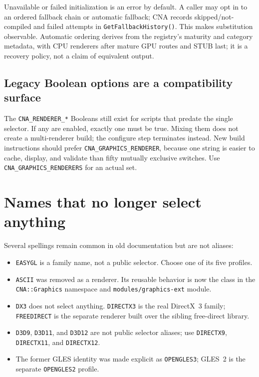 Unavailable or failed initialization is an error by default. A caller may opt in to an ordered
fallback chain or automatic fallback; CNA records skipped/not-compiled and failed attempts in
\texttt{GetFallbackHistory()}. This makes substitution observable. Automatic ordering derives
from the registry's maturity and category metadata, with CPU renderers after mature GPU routes and
STUB last; it is a recovery policy, not a claim of equivalent output.

\subsection{Legacy Boolean options are a compatibility surface}

The \texttt{CNA\_RENDERER\_*} Booleans still exist for scripts that predate the single selector.
If any are enabled, exactly one must be true. Mixing them does not create a multi-renderer build;
the configure step terminates instead. New build instructions should prefer
\texttt{CNA\_GRAPHICS\_RENDERER}, because one string is easier to cache, display, and validate
than fifty mutually exclusive switches. Use \texttt{CNA\_GRAPHICS\_RENDERERS} for an actual set.

\section{Names that no longer select anything}

Several spellings remain common in old documentation but are not aliases:

\begin{itemize}
  \item \texttt{EASYGL} is a family name, not a public selector. Choose one of its five profiles.
  \item \texttt{ASCII} was removed as a renderer. Its reusable behavior is now the
     class in the \texttt{CNA::Graphics} namespace and
    \texttt{modules/graphics-ext} module.
  \item \texttt{DX3} does not select anything. \texttt{DIRECTX3} is the real DirectX~3 family;
    \texttt{FREEDIRECT} is the separate renderer built over the sibling free-direct library.
  \item \texttt{D3D9}, \texttt{D3D11}, and \texttt{D3D12} are not public selector aliases;
    use \texttt{DIRECTX9}, \texttt{DIRECTX11}, and \texttt{DIRECTX12}.
  \item The former GLES identity was made explicit as \texttt{OPENGLES3}; GLES~2 is the separate
    \texttt{OPENGLES2} profile.
\end{itemize}

